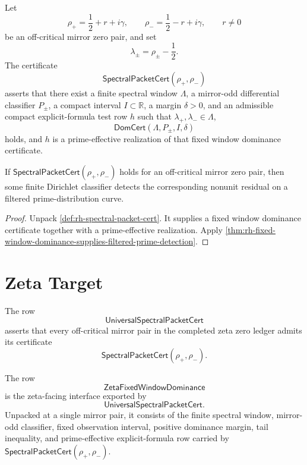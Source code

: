 \begin{definition}[SpectralPacketCert]
\label{def:rh-spectral-packet-cert}
Let
$$
\rho_+=\frac12+r+i\gamma,
\qquad
\rho_-=\frac12-r+i\gamma,
\qquad
r\ne0
$$
be an off-critical mirror zero pair, and set
$$
\lambda_\pm=\rho_\pm-\frac12.
$$
The certificate
$$
\mathsf{SpectralPacketCert}(\rho_+,\rho_-)
$$
asserts that there exist a finite spectral window $\Lambda$, a
mirror-odd differential classifier $P_\pm$, a compact interval
$I\subset\mathbb R$, a margin $\delta>0$, and an admissible compact
explicit-formula test row $h$ such that $\lambda_+,\lambda_-\in\Lambda$,
$$
\mathsf{DomCert}(\Lambda,P_\pm,I,\delta)
$$
holds, and $h$ is a prime-effective realization of that fixed window
dominance certificate.
\end{definition}

\begin{theorem}
\label{thm:rh-spectral-packet-cert-gives-filtered-prime-detection}
If $\mathsf{SpectralPacketCert}(\rho_+,\rho_-)$ holds for an
off-critical mirror zero pair, then some finite Dirichlet classifier
detects the corresponding nonunit residual on a filtered
prime-distribution curve.
\end{theorem}

\begin{proof}
Unpack \autoref{def:rh-spectral-packet-cert}.  It supplies a fixed
window dominance certificate together with a prime-effective
realization.  Apply
\autoref{thm:rh-fixed-window-dominance-supplies-filtered-prime-detection}.
\end{proof}

\section{Zeta Target}
\label{sec:rh-fixed-window-zeta-target}

\begin{definition}[UniversalSpectralPacketCert]
\label{def:rh-universal-spectral-packet-cert}
The row
$$
\mathsf{UniversalSpectralPacketCert}
$$
asserts that every off-critical mirror pair in the completed zeta
zero ledger admits its certificate
$$
\mathsf{SpectralPacketCert}(\rho_+,\rho_-).
$$
\end{definition}

\begin{definition}[ZetaFixedWindowDominance]
\label{def:rh-zeta-fixed-window-dominance}
The row
$$
\mathsf{ZetaFixedWindowDominance}
$$
is the zeta-facing interface exported by
$$
\mathsf{UniversalSpectralPacketCert}.
$$
Unpacked at a single mirror pair, it consists of the finite spectral
window, mirror-odd classifier, fixed observation interval, positive
dominance margin, tail inequality, and prime-effective
explicit-formula row carried by
$\mathsf{SpectralPacketCert}(\rho_+,\rho_-)$.
\end{definition}

